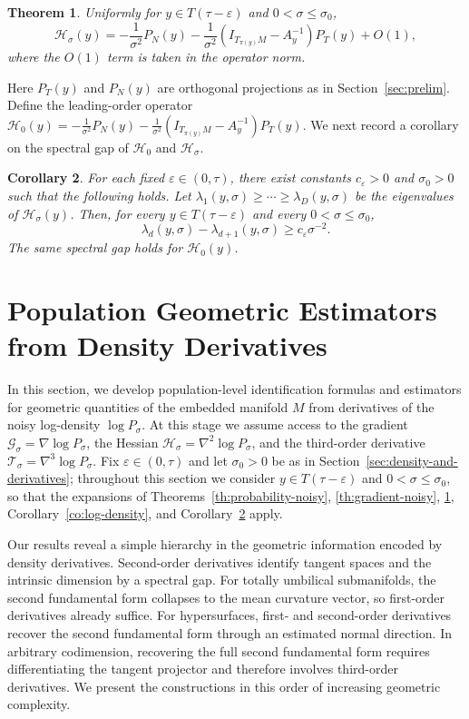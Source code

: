 \documentclass[11pt]{article}
\theoremstyle{plain}
\newtheorem{theorem}{Theorem}[section]
\newtheorem{corollary}[theorem]{Corollary}
\theoremstyle{definition}
\begin{document}
\begin{theorem}\label{th:noisy-hessian}
Uniformly for $y\in T(\tau-\varepsilon)$ and $0<\sigma\le\sigma_0$,
\[
\mathcal{H}_\sigma(y)
= - \frac{1}{\sigma^2}P_N(y)
- \frac{1}{\sigma^2}(I_{T_{\pi(y)}M} - A_y^{-1})P_T(y)
+ O(1),
\]
where the $O(1)$ term is taken in the operator norm.
\end{theorem}
Here $P_T(y)$ and $P_N(y)$ are orthogonal projections as in Section~\ref{sec:prelim}.
Define the leading-order operator $\mathcal{H}_0(y) = - \frac{1}{\sigma^2}P_N(y) - \frac{1}{\sigma^2}(I_{T_{\pi(y)}M} - A_y^{-1})P_T(y)$. We next record a corollary on the spectral gap of $\mathcal H_0$ and $\mathcal H_\sigma$.
\begin{corollary}\label{co:noisy-hessian-gap}
For each fixed $\varepsilon\in(0,\tau)$, there exist constants $c_\varepsilon>0$ and $\sigma_0>0$ such that the following holds. Let $\lambda_1(y,\sigma)\ge \cdots \ge \lambda_D(y,\sigma)$
be the eigenvalues of $\mathcal H_\sigma(y)$. Then, for every $y\in T(\tau-\varepsilon)$ and every $0<\sigma\le \sigma_0$,
\[
\lambda_d(y,\sigma)-\lambda_{d+1}(y,\sigma)\ge c_\varepsilon \sigma^{-2}.
\]
The same spectral gap holds for $\mathcal H_0(y)$.
\end{corollary}

\section{Population Geometric Estimators from Density Derivatives}\label{sec:compute-geometry}
In this section, we develop population-level identification formulas and estimators for geometric quantities of the embedded manifold $M$ from derivatives of the noisy log-density $\log P_\sigma$. At this stage we assume access to the gradient $\mathcal G_\sigma = \nabla \log P_\sigma$, the Hessian $\mathcal H_\sigma = \nabla^2 \log P_\sigma$, and the third-order derivative $\mathcal T_\sigma = \nabla^3 \log P_\sigma$. Fix $\varepsilon \in (0,\tau)$ and let $\sigma_0>0$ be as in Section~\ref{sec:density-and-derivatives}; throughout this section we consider $y\in T(\tau-\varepsilon)$ and $0<\sigma\le \sigma_0$, so that the expansions of Theorems~\ref{th:probability-noisy}, \ref{th:gradient-noisy}, \ref{th:noisy-hessian}, Corollary~\ref{co:log-density}, and Corollary~\ref{co:noisy-hessian-gap} apply.

Our results reveal a simple hierarchy in the geometric information encoded by density derivatives. Second-order derivatives identify tangent spaces and the intrinsic dimension by a spectral gap. For totally umbilical submanifolds, the second fundamental form collapses to the mean curvature vector, so first-order derivatives already suffice. For hypersurfaces, first- and second-order derivatives recover the second fundamental form through an estimated normal direction. In arbitrary codimension, recovering the full second fundamental form requires differentiating the tangent projector and therefore involves third-order derivatives. We present the constructions in this order of increasing geometric complexity.
\end{document}
